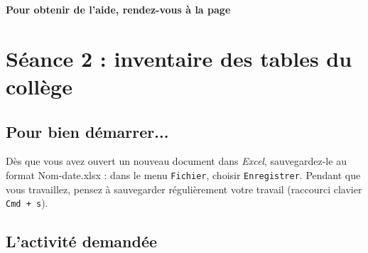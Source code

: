 \textbf{Pour obtenir de l'aide, rendez-vous à la page \pageref{Tableur5eOutils}}





\vfill
\phantom{rien}




%
%
%
%



\section{Séance 2 : inventaire des tables du collège}\label{ficheTableur5e2}

\subsection{Pour bien démarrer...}

Dès que vous avez ouvert un nouveau document dans \emph{Excel}, sauvegardez-le au format Nom-date.xlsx : dans le menu \texttt{Fichier}, choisir \texttt{Enregistrer}. Pendant que vous travaillez, pensez à sauvegarder régulièrement votre travail (raccourci clavier \texttt{Cmd + s}).   



\subsection{L'activité demandée}

\vspace{10pt}

